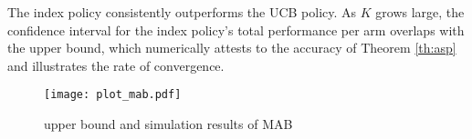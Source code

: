 The index policy consistently outperforms the UCB policy. As $K$ grows large, the confidence interval for the index policy's total performance per arm overlaps with the upper bound, which numerically attests to the accuracy of Theorem \ref{th:asp} and illustrates the rate of convergence.

\begin{figure}\label{fig:mab}
\begin{center}
\texttt{[image: plot\_mab.pdf]}
\caption{upper bound and simulation results of MAB}
\end{center}
\end{figure}

%
%
%
